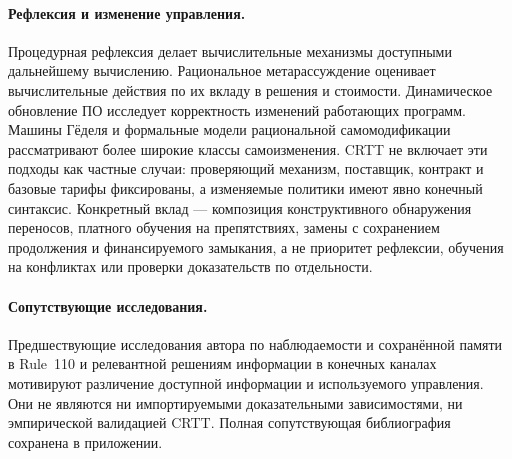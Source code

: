 \documentclass[10pt,a4paper]{article}
\begin{document}
\paragraph{Рефлексия и изменение управления.}
Процедурная рефлексия \cite{smith1984} делает вычислительные механизмы доступными дальнейшему вычислению. Рациональное метарассуждение \cite{russell1991} оценивает вычислительные действия по их вкладу в решения и стоимости. Динамическое обновление ПО \cite{stoyle2007} исследует корректность изменений работающих программ. Машины Гёделя \cite{schmidhuber2007} и формальные модели рациональной самомодификации \cite{everitt2016} рассматривают более широкие классы самоизменения. CRTT не включает эти подходы как частные случаи: проверяющий механизм, поставщик, контракт и базовые тарифы фиксированы, а изменяемые политики имеют явно конечный синтаксис. Конкретный вклад --- композиция конструктивного обнаружения переносов, платного обучения на препятствиях, замены с сохранением продолжения и финансируемого замыкания, а не приоритет рефлексии, обучения на конфликтах или проверки доказательств по отдельности.

\paragraph{Сопутствующие исследования.}
Предшествующие исследования автора по наблюдаемости и сохранённой памяти в Rule~110 \cite{strand110observer2026,strand110memory2026} и релевантной решениям информации в конечных каналах \cite{strandcontrol2026} мотивируют различение доступной информации и используемого управления. Они не являются ни импортируемыми доказательными зависимостями, ни эмпирической валидацией CRTT. Полная сопутствующая библиография сохранена в приложении.
\end{document}
